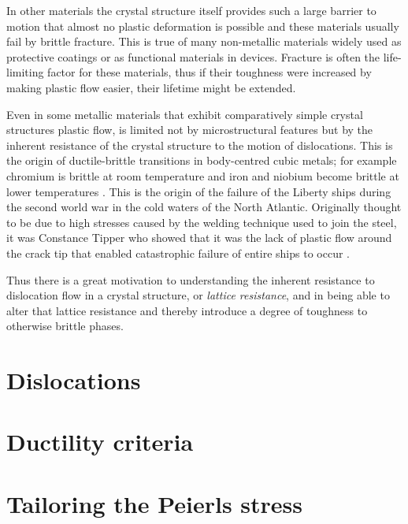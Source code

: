 In other materials the crystal structure itself provides such a large barrier to motion that almost no plastic deformation is possible and these materials usually fail by brittle fracture. This is true of many non-metallic materials widely used as protective coatings or as functional materials in devices. Fracture is often the life-limiting factor for these materials, thus if their toughness were increased by making plastic flow easier, their lifetime might be extended. 

Even in some metallic materials that exhibit comparatively simple crystal structures plastic flow, is limited not by microstructural features but by the inherent resistance of the crystal structure to the motion of dislocations. This is the origin of ductile-brittle transitions in body-centred cubic metals; for example chromium is brittle at room temperature \cite{Harada2004} and iron and niobium become brittle at lower temperatures \cite{Christian1983,Weinberger2013}. This is the origin of the failure of the Liberty ships during the second world war in the cold waters of the North Atlantic. Originally thought to be due to high stresses caused by the welding technique used to join the steel, it was Constance Tipper who showed that it was the lack of plastic flow around the crack tip that enabled catastrophic failure of entire ships to occur \cite{Cottrell1997}. 

Thus there is a great motivation to understanding the inherent resistance to dislocation flow in a crystal structure, or \emph{lattice resistance}, and in being able to alter that lattice resistance and thereby introduce a degree of toughness to otherwise brittle phases.



\section{Dislocations}  
\label{sec:dislocations}



\section{Ductility criteria}
\label{sec:ductility_criteria}





\section{Tailoring the Peierls stress}
\label{sec:tailor_peierls}




